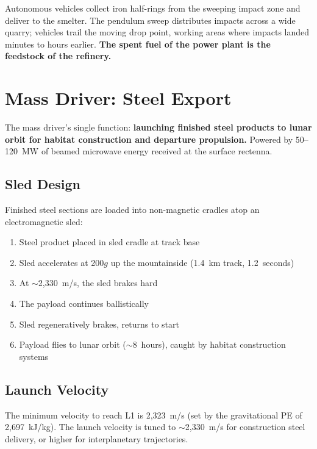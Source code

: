 \documentclass[12pt,letterpaper]{article}
\begin{document}
Autonomous vehicles collect iron half-rings from the sweeping impact zone and deliver to the smelter. The pendulum sweep distributes impacts across a wide quarry; vehicles trail the moving drop point, working areas where impacts landed minutes to hours earlier. \textbf{The spent fuel of the power plant is the feedstock of the refinery.}

\section{Mass Driver: Steel Export}

The mass driver's single function: \textbf{launching finished steel products to lunar orbit for habitat construction and departure propulsion.} Powered by 50--120~MW of beamed microwave energy received at the surface rectenna.

\subsection{Sled Design}

Finished steel sections are loaded into non-magnetic cradles atop an electromagnetic sled:

\begin{enumerate}[label=(\roman*)]
\item Steel product placed in sled cradle at track base
\item Sled accelerates at 200$g$ up the mountainside (1.4~km track, 1.2~seconds)
\item At $\sim$2,330~m/s, the sled brakes hard
\item The payload continues ballistically
\item Sled regeneratively brakes, returns to start
\item Payload flies to lunar orbit (${\sim}$8~hours), caught by habitat construction systems
\end{enumerate}

\subsection{Launch Velocity}

The minimum velocity to reach L1 is 2,323~m/s (set by the gravitational PE of 2,697~kJ/kg). The launch velocity is tuned to ${\sim}$2,330~m/s for construction steel delivery, or higher for interplanetary trajectories.
\end{document}
